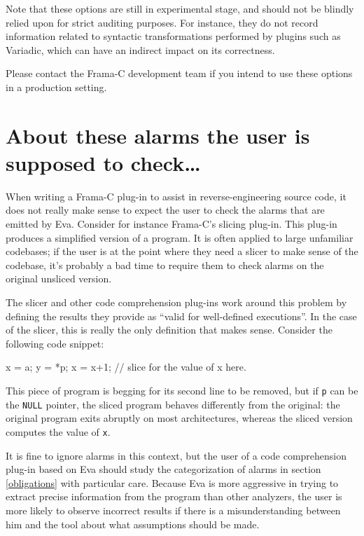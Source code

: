 \documentclass[web]{frama-c-book}
\newcommand{\Eva}{\textsf{Eva}}
\begin{document}
Note that these options are still in experimental stage, and should not be
blindly relied upon for strict auditing purposes. For instance, they do
not record information related to syntactic transformations performed by
plugins such as \textsf{Variadic}, which can have an indirect impact on
its correctness.

Please contact the Frama-C development team if you intend to use these
options in a production setting.

\section{About these alarms the user is supposed to check\ldots}

When writing a Frama-C plug-in to assist in
reverse-engineering source code, it does not really make sense to expect
the user to check the alarms that are emitted by \Eva{}.
Consider for instance Frama-C's slicing plug-in. This plug-in produces
a simplified version of a program. It is often applied to large unfamiliar
codebases; if the user is at the point where they need a slicer to make
sense of the codebase, it's probably a bad time to require
them to check alarms on the original unsliced version.

The slicer and other code comprehension plug-ins work around this problem
by defining the results they provide as ``valid for well-defined executions''.
In the case of the slicer, this is really the only definition that makes
sense. Consider the following code snippet:

\begin{listing}{1}
  x = a;
  y = *p;
  x = x+1;
  // slice for the value of x here.
\end{listing}

This piece of program is begging for its second line to be removed, but 
if \lstinline|p| can be the \lstinline|NULL| pointer, the sliced
program behaves differently from the original: the original program
exits abruptly on most architectures, whereas the sliced version
computes the value of \lstinline|x|.

It is fine to ignore alarms in this context,
but the user of a code comprehension plug-in based on \Eva{}
should study the categorization of alarms in section \ref{obligations}
with particular care.
Because \Eva{} is more aggressive 
in trying to extract precise information from the program than other
analyzers, the user is more likely to observe incorrect results if there
is a misunderstanding between him and the tool about what assumptions 
should be made.
\end{document}
